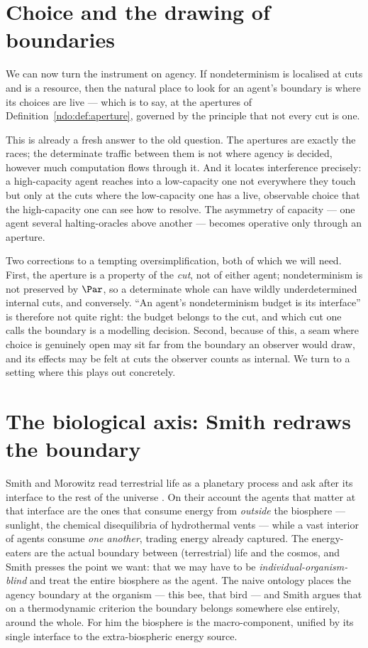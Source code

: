\bigskip
\section{Choice and the drawing of boundaries}\label{ndo:sec:boundaries}

We can now turn the instrument on agency. If nondeterminism is localised at cuts
and is a resource, then the natural place to look for an agent's boundary is where
its choices are live --- which is to say, at the apertures of
Definition~\ref{ndo:def:aperture}, governed by the principle that not every cut is
one.


\noindent
This is already a fresh answer to the old question. The apertures are exactly the
races; the determinate traffic between them is not where agency is decided, however
much computation flows through it. And it locates interference precisely: a
high-capacity agent reaches into a low-capacity one not everywhere they touch but
only at the cuts where the low-capacity one has a live, observable choice that the
high-capacity one can see how to resolve. The asymmetry of capacity --- one agent
several halting-oracles above another --- becomes operative only through an aperture.

Two corrections to a tempting oversimplification, both of which we will need. First,
the aperture is a property of the \emph{cut}, not of either agent; nondeterminism is
not preserved by $\Par$, so a determinate whole can have wildly underdetermined
internal cuts, and conversely. ``An agent's nondeterminism budget is its interface''
is therefore not quite right: the budget belongs to the cut, and which cut one calls
the boundary is a modelling decision. Second, because of this, a seam where choice is
genuinely open may sit far from the boundary an observer would draw, and its effects
may be felt at cuts the observer counts as internal. We turn to a setting where this
plays out concretely.


\section{The biological axis: Smith redraws the boundary}\label{ndo:sec:smith}

Smith and Morowitz read terrestrial life as a planetary process and ask after its
interface to the rest of the universe \cite{SmithMorowitz}. On their account the agents that
matter at that interface are the ones that consume energy from \emph{outside} the
biosphere --- sunlight, the chemical disequilibria of hydrothermal vents --- while a
vast interior of agents consume \emph{one another}, trading energy already captured.
The energy-eaters are the actual boundary between (terrestrial) life and the cosmos,
and Smith presses the point we want: that we may have to be
\emph{individual-organism-blind} and treat the entire biosphere as the agent. The
naive ontology places the agency boundary at the organism --- this bee, that bird ---
and Smith argues that on a thermodynamic criterion the boundary belongs somewhere else
entirely, around the whole. For him the biosphere is the macro-component, unified by
its single interface to the extra-biospheric energy source.

